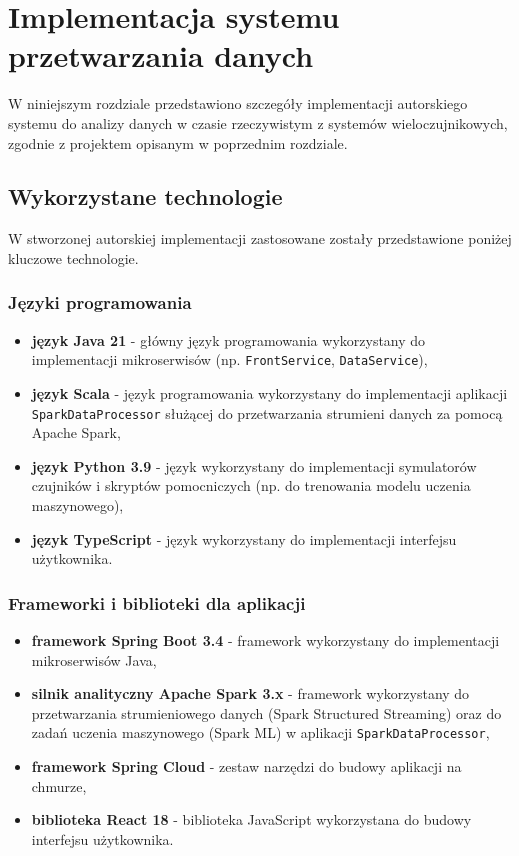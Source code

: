 \section{Implementacja systemu przetwarzania danych}
\label{sec:implementacja_systemu}

W niniejszym rozdziale przedstawiono szczegóły implementacji autorskiego systemu do analizy danych w czasie rzeczywistym z systemów wieloczujnikowych,
zgodnie z projektem opisanym w poprzednim rozdziale.

\subsection{Wykorzystane technologie}
\label{subsec:technologie}

W stworzonej autorskiej implementacji zastosowane zostały przedstawione poniżej kluczowe technologie.

\subsubsection{Języki programowania}
\label{subsubsec:jezyki_programowania}

\begin{itemize}
    \item \textbf{język Java 21} - główny język programowania wykorzystany do implementacji mikroserwisów (np. \texttt{FrontService}, \texttt{DataService}),
    \item \textbf{język Scala} - język programowania wykorzystany do implementacji aplikacji \texttt{SparkDataProcessor} służącej do przetwarzania strumieni danych za pomocą Apache Spark,
    \item \textbf{język Python 3.9} - język wykorzystany do implementacji symulatorów czujników i skryptów pomocniczych (np. do trenowania modelu uczenia maszynowego),
    \item \textbf{język TypeScript} - język wykorzystany do implementacji interfejsu użytkownika.
\end{itemize}

\subsubsection{Frameworki i biblioteki dla aplikacji}
\label{subsubsec:frameworki}

\begin{itemize}
    \item \textbf{framework Spring Boot 3.4} - framework wykorzystany do implementacji mikroserwisów Java,
    \item \textbf{silnik analityczny Apache Spark 3.x} \cite{spark_streaming} - framework wykorzystany do przetwarzania strumieniowego danych (Spark Structured Streaming) \cite{chambers2018spark} oraz do zadań uczenia maszynowego (Spark ML) w aplikacji \texttt{SparkDataProcessor},
    \item \textbf{framework Spring Cloud} - zestaw narzędzi do budowy aplikacji na chmurze,
    \item \textbf{biblioteka React 18} - biblioteka JavaScript wykorzystana do budowy interfejsu użytkownika.
\end{itemize}

